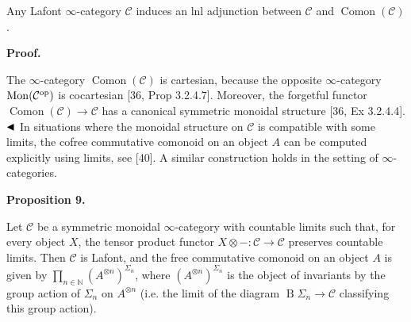  
Any Lafont $\infty$-category ${\mathcal{C}}$ induces an lnl adjunction between ${\mathcal{C}}$ and $\operatorname{Comon}({\mathcal{C}})$.\par
 
 
 
 
\par\medskip\noindent\textbf{Proof.}\par
 
 
The $\infty$-category $\operatorname{Comon}({\mathcal{C}})$ is cartesian, because the opposite $\infty$-category $\operatorname{Mon}({\mathcal{C}}^{\textnormal{op}})$ is cocartesian [36, Prop 3.2.4.7]. Moreover, the forgetful functor $\operatorname{Comon}({\mathcal{C}})\to{\mathcal{C}}$ has a canonical symmetric monoidal structure [36, Ex 3.2.4.4]. $\hfill\blacktriangleleft$ In situations where the monoidal structure on ${\mathcal{C}}$ is compatible with some limits, the cofree commutative comonoid on an object $A$ can be computed explicitly using limits, see [40]. A similar construction holds in the setting of $\infty$-categories.\par
 
 
 
\par\medskip\noindent\textbf{Proposition 9.}\par
 
 
Let ${\mathcal{C}}$ be a symmetric monoidal $\infty$-category with countable limits such that, for every object $X$, the tensor product functor $X\otimes-:{\mathcal{C}}\to{\mathcal{C}}$ preserves countable limits. Then ${\mathcal{C}}$ is Lafont, and the free commutative comonoid on an object $A$ is given by $\prod_{n\in\mathbb{N}}(A^{\otimes n})^{\Sigma_{n}}$, where $(A^{\otimes n})^{\Sigma_{n}}$ is the object of invariants by the group action of $\Sigma_{n}$ on $A^{\otimes n}$ (i.e. the limit of the diagram $\operatorname{B}\Sigma_{n}\to{\mathcal{C}}$ classifying this group action).\par
 
 
 
